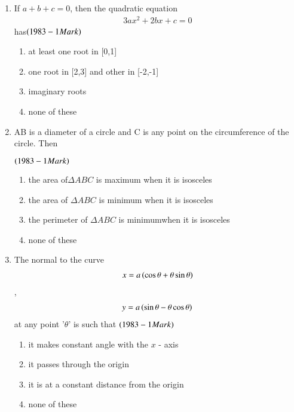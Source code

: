 \documentclass[journal,12pt,twocolumn]{IEEEtran}
\theoremstyle{remark}
\begin{document}
\begin{enumerate}

        \item If $a+b+c = 0$, then the quadratic equation 
		\begin{align*}3ax^2 + 2bx + c = 0\end{align*} has\hfill$\left(1983 - 1 Mark\right)$

\begin{enumerate}
	\item at least one root in [0,1]
	\item one root in [2,3] and other in [-2,-1]
        \item imaginary roots
	\item none of these\\
\end{enumerate}

         \item AB is a diameter of a circle and C is any point on the
circumference of the circle. Then 

		\hfill$\left(1983 - 1 Mark\right)$

\begin{enumerate}
	\item the area of$\Delta ABC$ is maximum when it is isosceles
	\item the area of $\Delta ABC$ is minimum when it is isosceles
	\item the perimeter of $\Delta ABC$ is minimumwhen it is isosceles
	\item none of these\\
\end{enumerate}

         \item The normal to the curve 
\begin{align*}x = a\left(\cos \theta + \theta\sin \theta\right)\end{align*},
\begin{align*}y = a\left(\sin \theta - \theta\cos \theta\right)\end{align*}at 
any point '$\theta$' is such that \hfill$\left(1983 - 1 Mark\right)$

\begin{enumerate}
	\item it makes  constant angle with the $x$ - axis
	\item it passes through the origin
	\item it is at a constant distance from the origin
	\item none of these\\
\end{enumerate}


\end{enumerate}
\end{document}
